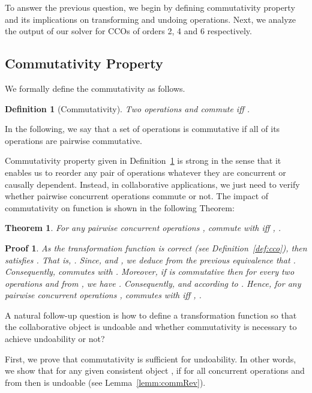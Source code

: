 \documentclass[submission,copyright,creativecommons]{eptcs}
\newtheorem{definition}{Definition}
\newtheorem*{proof*}{Proof}\newtheorem{theorem}{Theorem}
\begin{document}
To answer the previous question, we begin by defining commutativity property and its implications on
transforming and undoing operations. Next, we analyze the output of our solver for CCOs of orders 2, 4 and 6 respectively.

\subsection{Commutativity Property}




We formally define the commutativity as follows.
\begin{definition}[Commutativity]\label{def:commutativity}
Two  operations   and    commute iff  .
\end{definition}

In the following, we say that a set of operations  is commutative if all of its operations are pairwise commutative.

Commutativity property given in Definition~\ref{def:commutativity} is strong in the sense that it enables us to reorder
any pair of operations whatever they are concurrent or causally dependent. Instead, in collaborative applications, we just need  to verify whether pairwise concurrent operations commute or not.
The impact of commutativity on  function  is shown in the following Theorem:

\begin{theorem}\label{thr:concCommutativity}  
 For any pairwise concurrent operations ,  commute with    iff   , .
\end{theorem}

\begin{proof*}
As the transformation function  is correct (see Definition~\ref{def:cco}), then  satisfies . That is, . Since, 
 and , we deduce from the previous equivalence that . Consequently,  commutes with .
Moreover, if  is commutative then for every two operations  and  from , we have . Consequently,    and  according to .
Hence, for any pairwise concurrent operations ,  commutes with    iff   , .
\end{proof*}

A natural follow-up question is how to define  a transformation function so that the collaborative
object is undoable and whether commutativity is necessary to achieve undoability or not? 


First, we prove  that commutativity is sufficient for undoability. In other words,
we  show   that for any given consistent object ,   if    for all concurrent operations  and  from     then  is undoable (see  Lemma~\ref{lemm:commRev}).
 
\end{document}
